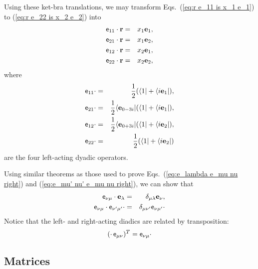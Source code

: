 \documentclass[11pt,twocolumn]{article}
\begin{document}
Using these ket-bra translations, we may transform Eqs.~(\ref{eq:r e_11 is x_1 e_1}) to (\ref{eq:r e_22 is x_2 e_2}) into
\begin{eqnarray}
\label{eq:e_11 r is x_1 e_1}
\textsf e_{11}\cdot\mathbf r&=&x_1\mathbf e_1,\\
\label{eq:e_21 r is x_1 e_1}
\textsf e_{21}\cdot\mathbf r&=&x_1\mathbf e_2,\\
\label{eq:e_12 r is x_2 e_1}
\textsf e_{12}\cdot\mathbf r&=&x_2\mathbf e_1,\\
\label{eq:e_22 r is x_2 e_2}
\textsf e_{22}\cdot\mathbf r&=&x_2\mathbf e_2,
\end{eqnarray}
where
\begin{eqnarray}
\label{eq:e_11 is 1 + ie_1 left}
\textsf e_{11}\cdot&=&\frac{1}{2}(\langle 1|+\langle i\mathbf e_1|),\\
\label{eq:e_21 is e_0-3i times 1 + ie_1 left}
\textsf e_{21}\cdot&=&\frac{1}{2}\langle\mathbf e_{0-3i}|(\langle 1|+\langle i\mathbf e_1|),\\
\label{eq:e_12 is e_0+3i times 1 + ie_2 left}
\textsf e_{12}\cdot&=&\frac{1}{2}\langle\mathbf e_{0+3i}|(\langle 1|+\langle i\mathbf e_2|),\\
\label{eq:e_22 is 1 + ie_2 left}
\textsf e_{22}\cdot&=&\frac{1}{2}(\langle 1|+\langle i\mathbf e_2|)
\end{eqnarray}
are the four left-acting dyadic operators.

Using similar theorems as those used to prove Eqs.~(\ref{eq:e_lambda e_mu nu right}) and (\ref{eq:e_mu' nu' e_mu nu right}), we can show that
\begin{eqnarray}
\label{eq:e_numu e_lambda left}
\textsf e_{\nu\mu}\cdot\mathbf e_\lambda&=&\delta_{\mu\lambda}\mathbf e_\nu,\\
\label{eq:e_numu e_nu'mu' left}
\textsf e_{\nu\mu}\cdot\textsf e_{\nu'\mu'}\cdot&=&\delta_{\mu\nu'}\textsf e_{\nu\mu'}\cdot
\end{eqnarray}
Notice that the left- and right-acting diadics are related by transposition:
\begin{equation}
\label{eq:e_munu right transpose is e_numu left}
(\cdot\,\textsf e_{\mu\nu})^T=\textsf e_{\nu\mu}\cdot
\end{equation}

\subsection{Matrices}
\end{document}
